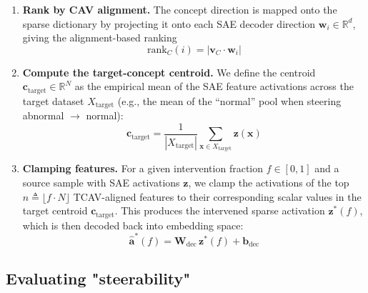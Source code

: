 \documentclass{article}
\begin{document}
\begin{enumerate}
    \item \textbf{Rank by CAV alignment.} The concept direction is mapped onto the sparse dictionary by projecting it onto each SAE decoder direction $\mathbf{w}_i \in \mathbb{R}^d$, giving                         the alignment-based ranking
    \begin{equation}
         \mathrm{rank}_C(i) = |\mathbf{v}_C \cdot \mathbf{w}_i|
    \label{eq:rank_features}
    \end{equation}
    
    \item \textbf{Compute the target-concept centroid.} We define the centroid $\mathbf{c}_{\text{target}} \in \mathbb{R}^N$ as the empirical mean of the SAE feature activations across the target dataset $X_{\text{target}}$ (e.g., the mean of the ``normal'' pool when steering abnormal $\to$ normal):
    \begin{equation}
        \mathbf{c}_{\text{target}} = \frac{1}{|X_{\text{target}}|} \sum_{\mathbf{x} \in X_{\text{target}}} \mathbf{z}(\mathbf{x})
    \label{eq:c_target}
    \end{equation}
    
    \item \textbf{Clamping features.} For a given intervention fraction $f \in [0, 1]$ and a source sample with SAE activations $\mathbf{z}$, we clamp the activations of the top $n \triangleq \lfloor f \cdot N \rfloor$ TCAV-aligned features to their corresponding scalar values in the target centroid $\mathbf{c}_{\text{target}}$. This produces the intervened sparse activation $\mathbf{z}^{*}(f)$, which is then decoded back into embedding space:
    \begin{equation}
        \hat{\mathbf{a}}^*(f) = \mathbf{W}_{\text{dec}}\,\mathbf{z}^*(f) + \mathbf{b}_{\text{dec}}
    \label{eq:sae_decode}
    \end{equation}
\end{enumerate}



\subsection{Evaluating "steerability"}\label{sec:evaluating:steerability}
\label{sec:steering_eval}
\end{document}
